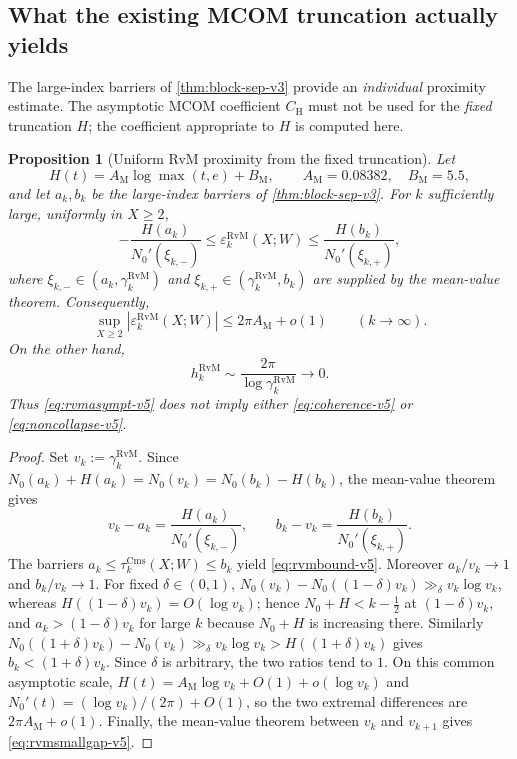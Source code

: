 \documentclass[11pt,a4paper]{article}
\numberwithin{equation}{section}
\newtheorem{proposition}[theorem]{Proposition}
\theoremstyle{definition}
\theoremstyle{remark}
\newcommand{\Cms}{\mathrm{Cms}}
\begin{document}
\subsection{What the existing MCOM truncation actually yields}
The large-index barriers of \cref{thm:block-sep-v3} provide an
\emph{individual} proximity estimate.  The asymptotic MCOM coefficient
$C_{\mathrm H}$ must not be used for the \emph{fixed} truncation $H$;
the coefficient appropriate to $H$ is computed here.
\begin{proposition}[Uniform RvM proximity from the fixed truncation]
\label{prop:rvmbound-v5}
Let
\begin{equation}
 H(t)=A_{\mathrm M}\log\max(t,e)+B_{\mathrm M},\qquad
 A_{\mathrm M}=0.08382,\quad B_{\mathrm M}=5.5,
\end{equation}
and let $a_k,b_k$ be the large-index barriers of
\cref{thm:block-sep-v3}.  For $k$ sufficiently large, uniformly in $X\ge2$,
\begin{equation}\label{eq:rvmbound-v5}
 -\frac{H(a_k)}{N_0'(\xi_{k,-})}
 \le\varepsilon_k^{\mathrm{RvM}}(X;W)
 \le\frac{H(b_k)}{N_0'(\xi_{k,+})},
\end{equation}
where $\xi_{k,-}\in(a_k,\gamma_k^{\mathrm{RvM}})$ and
$\xi_{k,+}\in(\gamma_k^{\mathrm{RvM}},b_k)$ are supplied by the mean-value
theorem.  Consequently,
\begin{equation}\label{eq:rvmasympt-v5}
 \boxed{\quad
 \sup_{X\ge2}|\varepsilon_k^{\mathrm{RvM}}(X;W)|
 \le 2\pi A_{\mathrm M}+o(1)
 \qquad(k\to\infty).
 \quad}
\end{equation}
On the other hand,
\begin{equation}\label{eq:rvmsmallgap-v5}
 h_k^{\mathrm{RvM}}\sim
 \frac{2\pi}{\log\gamma_k^{\mathrm{RvM}}}\to0.
\end{equation}
Thus \eqref{eq:rvmasympt-v5} does not imply either
\eqref{eq:coherence-v5} or \eqref{eq:noncollapse-v5}.
\end{proposition}
\begin{proof}
Set $v_k:=\gamma_k^{\mathrm{RvM}}$.  Since
\(N_0(a_k)+H(a_k)=N_0(v_k)=N_0(b_k)-H(b_k)\),
the mean-value theorem gives
\begin{equation}
 v_k-a_k=\frac{H(a_k)}{N_0'(\xi_{k,-})},\qquad
 b_k-v_k=\frac{H(b_k)}{N_0'(\xi_{k,+})}.
\end{equation}
The barriers $a_k\le\tau_k^{\Cms}(X;W)\le b_k$ yield
\eqref{eq:rvmbound-v5}.  Moreover $a_k/v_k\to1$ and $b_k/v_k\to1$.
For fixed $\delta\in(0,1)$, $N_0(v_k)-N_0((1-\delta)v_k)\gg_\delta
v_k\log v_k$, whereas $H((1-\delta)v_k)=O(\log v_k)$; hence
$N_0+H<k-\frac12$ at $(1-\delta)v_k$, and $a_k>(1-\delta)v_k$ for large
$k$ because $N_0+H$ is increasing there. Similarly
$N_0((1+\delta)v_k)-N_0(v_k)\gg_\delta v_k\log v_k>H((1+\delta)v_k)$
gives $b_k<(1+\delta)v_k$. Since $\delta$ is arbitrary, the two ratios
tend to $1$.
On this common asymptotic scale,
$H(t)=A_{\mathrm M}\log v_k+O(1)+o(\log v_k)$ and
$N_0'(t)=(\log v_k)/(2\pi)+O(1)$, so the two extremal
differences are $2\pi A_{\mathrm M}+o(1)$.
Finally, the mean-value theorem between $v_k$ and $v_{k+1}$
gives \eqref{eq:rvmsmallgap-v5}.
\end{proof}
\end{document}
